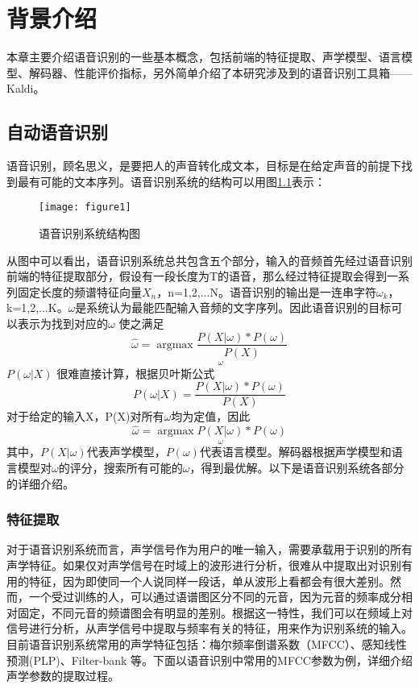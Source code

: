 
\chapter{背景介绍}
本章主要介绍语音识别的一些基本概念，包括前端的特征提取、声学模型、语言模型、解码器、性能评价指标，另外简单介绍了本研究涉及到的语音识别工具箱——Kaldi\cite{povey2011kaldi}。
\section{自动语音识别}
语音识别，顾名思义，是要把人的声音转化成文本，目标是在给定声音的前提下找到最有可能的文本序列。语音识别系统的结构可以用图\ref{fig:figure1}表示：
\begin{figure}[htbp]
\centering
\texttt{[image: figure1]}
\caption{语音识别系统结构图}\label{fig:figure1}
\vspace{\baselineskip}
\end{figure}
从图中可以看出，语音识别系统总共包含五个部分，输入的音频首先经过语音识别前端的特征提取部分，假设有一段长度为T的语音，那么经过特征提取会得到一系列固定长度的频谱特征向量$X_{n}$，n=1,2,...N。语音识别的输出是一连串字符$\omega_{k}$，k=1,2,...K。$\omega$是系统认为最能匹配输入音频的文字序列。因此语音识别的目标可以表示为找到对应的$\omega$ 使之满足
\begin{equation}\widehat{\omega} = \underset{\omega}{\operatorname{argmax} \frac{P(X|\omega)*P(\omega)}{P(X)}}\end{equation}$P(\omega|X)$
很难直接计算，根据贝叶斯公式
\begin{equation}P(\omega|X)=\frac{P(X|\omega)*P(\omega)}{P(X)}\end{equation}
对于给定的输入X，P(X)对所有$\omega$均为定值，因此
\begin{equation}\widehat{\omega} = \underset{\omega}{\operatorname{argmax} P(X|\omega)*P(\omega)}\end{equation}\label{ASR cost function}
其中，$P(X|\omega)$代表声学模型，$P(\omega)$代表语言模型。解码器根据声学模型和语言模型对$\omega$的评分，搜索所有可能的$\omega$，得到最优解。以下是语音识别系统各部分的详细介绍。
\subsection{特征提取}\label{MFCC}
对于语音识别系统而言，声学信号作为用户的唯一输入，需要承载用于识别的所有声学特征。如果仅对声学信号在时域上的波形进行分析，很难从中提取出对识别有用的特征，因为即使同一个人说同样一段话，单从波形上看都会有很大差别。然而，一个受过训练的人，可以通过语谱图区分不同的元音，因为元音的频率成分相对固定，不同元音的频谱图会有明显的差别。根据这一特性，我们可以在频域上对信号进行分析，从声学信号中提取与频率有关的特征，用来作为识别系统的输入。目前语音识别系统常用的声学特征包括：梅尔频率倒谱系数（MFCC）\cite{davis1980comparison}、感知线性预测(PLP)\cite{hermansky1990perceptual}、Filter-bank\cite{juang1987use} 等。下面以语音识别中常用的MFCC参数为例，详细介绍声学参数的提取过程。

